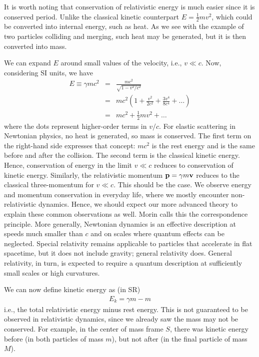 \documentclass[12pt]{article}
\newcommand{\be}{\begin{eqnarray}}
\newcommand{\ee}{\end{eqnarray}}
\begin{document}
It is worth noting that conservation of relativistic energy is much easier since it is conserved period. Unlike the classical kinetic counterpart $E = \frac{1}{2} mv^2$, which could be converted into internal energy, such as heat. As we see with the example of two particles colliding and merging, such heat may be generated, but it is then converted into mass. 

We can expand $E$ around small values of the velocity, i.e., $v \ll c$. Now, considering SI units, we have 
\be
E\equiv \gamma m c^2   &=& \frac{mc^2}{\sqrt{1-v^2 /c^2}} \nonumber \\
&=& mc^2 \left(1 + \frac{v^2}{2c^2} + \frac{3 v^4}{8c^4} + \dots\right) \nonumber \\
&=& mc^2 + \frac{1}{2} mv^2 + \dots
\ee
where the dots represent higher-order terms in $v/c$. For elastic scattering in Newtonian physics, no heat is generated, so mass is conserved. The first term on the right-hand side expresses that concept: $mc^2$ is the rest energy and is the same before and after the collision. The second term is the classical kinetic energy. Hence, conservation of energy in the limit $v\ll c$ reduces to conservation of kinetic energy. Similarly, the relativistic momentum ${\bf p}=\gamma m{\bf v}$ reduces to the classical three-momentum for $v\ll c$. This should be the case. We observe energy and momentum conservation in everyday life, where we mostly encounter non-relativistic dynamics. Hence, we should expect our more advanced theory to explain these common observations as well. Morin calls this the correspondence principle. More generally, Newtonian dynamics is an effective description at speeds much smaller than $c$ and on scales where quantum effects can be neglected. Special relativity remains applicable to particles that accelerate in flat spacetime, but it does not include gravity; general relativity does. General relativity, in turn, is expected to require a quantum description at sufficiently small scales or high curvatures.

We can now define kinetic energy as (in SR)
\be
E_k = \gamma m - m
\ee
i.e., the total relativistic energy minus rest energy. This is not guaranteed to be observed in relativistic dynamics, since we already saw the mass may not be conserved. For example, in the center of mass frame $S$, there was kinetic energy before (in both particles of mass $m$), but not after (in the final particle of mass $M$). 
\end{document}
